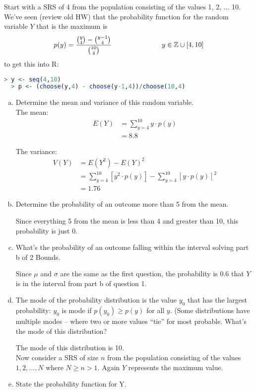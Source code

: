 \documentclass{scrartcl}
\begin{document}
\begin{enumerate}
Start with a SRS of 4 from the population consisting of the values 1, 2, ... 10. We’ve seen (review old HW) that the probability function for the random variable $Y$ that is the maximum is $$p(y) = \frac{{y \choose 4}-{y-1 \choose 4}}{{10 \choose 4}}\text{\hspace{1in}} y\in\mathbb{Z}\cup[4,10]$$ to get this into R:
\begin{lstlisting}[language=R]
  > y <- seq(4,10)
  > p <- (choose(y,4) - choose(y-1,4))/choose(10,4)
\end{lstlisting}
\begin{enumerate}[a)]
\item Determine the mean and variance of this random variable.\\
The mean:
\begin{align*}
  E(Y) &= \sum_{y=4}^{10}y\cdot p(y)\\
  &= 8.8
\end{align*}

The variance:
\begin{align*}
  V(Y) &= E(Y^2) - E(Y)^2\\
  &= \sum_{y=4}^{10}\left[y^2\cdot p(y)\right] - \sum_{y=4}^{10}\left[y\cdot p(y)\right]^2\\
  &= 1.76
\end{align*}

\item Determine the probability of an outcome more than 5 from the mean.

Since everything 5 from the mean is less than 4 and greater than 10, this probability is just 0.\\

\item What’s the probability of an outcome falling within the interval solving part b of 2 Bounds.

Since $\mu$ and $\sigma$ are the same as the first question, the probability is 0.6 that $Y$ is in the interval from part b of question 1.\\

\item The mode of the probability distribution is the value $y_0$ that has the largest probability: $y_0$ is mode if $p(y_0) \ge p(y)$ for all $y$. (Some distributions have multiple modes – where two or more values “tie” for most probable. What’s the mode of this distribution?

The mode of this distribution is 10.\\

Now consider a SRS of size $n$ from the population consisting of the values $1, 2, ..., N$ where $N \ge n > 1$. Again $Y$ represents the maximum value.
\item State the probability function for Y.


\end{enumerate}
\end{enumerate}
\end{document}

